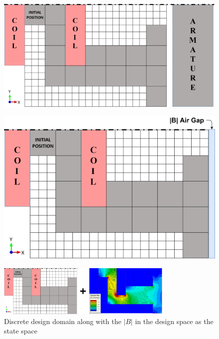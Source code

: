\begin{figure}[h!]
\centering
\begin{minipage}{.45\textwidth}
  \centering
  \includegraphics[width=0.8\linewidth]{Figures/Ch_MDP/state_repr_1.png}
  \label{fig:RL_state_repr_original}
\end{minipage}%
\begin{minipage}{.45\textwidth}
  \centering
  \includegraphics[width=0.8\linewidth]{Figures/Ch_MDP/state_repr_2.png}
  \label{fig:RL_state_repr_2}
\end{minipage}
\end{figure}

\begin{figure}[h!]
    \centering
    \includegraphics[width=0.75\textwidth]{Figures/Ch_MDP/state_repr_3_mdp.png}
    \caption{Discrete design domain  along with the $|B|$ in the design space as the state space}
    \label{fig:RL_state_repr_3_Bfield}
\end{figure}

